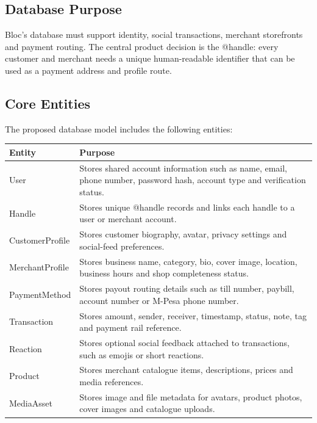 \documentclass[12pt,a4paper]{article}
\begin{document}
\subsection{Database Purpose}
Bloc's database must support identity, social transactions, merchant storefronts and payment routing. The central product decision is the @handle: every customer and merchant needs a unique human-readable identifier that can be used as a payment address and profile route.

\subsection{Core Entities}
The proposed database model includes the following entities:
\begin{longtable}{p{}p{}}
\toprule
\textbf{Entity} & \textbf{Purpose} \\
\midrule
User & Stores shared account information such as name, email, phone number, password hash, account type and verification status. \\
Handle & Stores unique @handle records and links each handle to a user or merchant account. \\
CustomerProfile & Stores customer biography, avatar, privacy settings and social-feed preferences. \\
MerchantProfile & Stores business name, category, bio, cover image, location, business hours and shop completeness status. \\
PaymentMethod & Stores payout routing details such as till number, paybill, account number or M-Pesa phone number. \\
Transaction & Stores amount, sender, receiver, timestamp, status, note, tag and payment rail reference. \\
Reaction & Stores optional social feedback attached to transactions, such as emojis or short reactions. \\
Product & Stores merchant catalogue items, descriptions, prices and media references. \\
MediaAsset & Stores image and file metadata for avatars, product photos, cover images and catalogue uploads. \\
\bottomrule
\end{longtable}
\end{document}
